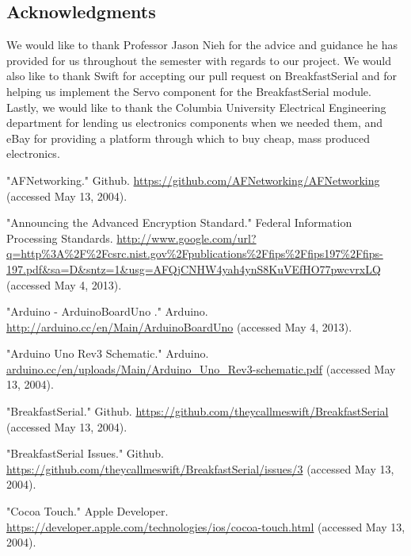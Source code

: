 \documentclass[10pt]{article}
\begin{document}
\begin{multicols}{2}
\section{Acknowledgments}
We would like to thank Professor Jason Nieh for the advice and guidance he has provided for us throughout the semester with regards to our project. We would also like to thank Swift \cite{swift} for accepting our pull request on BreakfastSerial and for helping us implement the Servo component for the BreakfastSerial module. Lastly, we would like to thank the Columbia University Electrical Engineering department for lending us electronics components when we needed them, and eBay for providing a platform through which to buy cheap, mass produced electronics. 






\begin{thebibliography}{99} %
  
  "AFNetworking." Github. \url{https://github.com/AFNetworking/AFNetworking} (accessed May 13, 2004).

"Announcing the Advanced Encryption Standard." Federal Information Processing Standards. \url{http://www.google.com/url?q=http\%3A\%2F\%2Fcsrc.nist.gov\%2Fpublications\%2Ffips\%2Ffips197\%2Ffips-197.pdf&sa=D&sntz=1&usg=AFQjCNHW4yah4ynS8KuVEfHO77pwcvrxLQ} (accessed May 4, 2013).

"Arduino - ArduinoBoardUno ." Arduino. \url{http://arduino.cc/en/Main/ArduinoBoardUno} (accessed May 4, 2013).

"Arduino Uno Rev3 Schematic." Arduino. \url{arduino.cc/en/uploads/Main/Arduino_Uno_Rev3-schematic.pdf} (accessed May 13, 2004).

"BreakfastSerial." Github. \url{https://github.com/theycallmeswift/BreakfastSerial} (accessed May 13, 2004).

"BreakfastSerial Issues." Github. \url{https://github.com/theycallmeswift/BreakfastSerial/issues/3} (accessed May 13, 2004).

"Cocoa Touch." Apple Developer. \url{https://developer.apple.com/technologies/ios/cocoa-touch.html} (accessed May 13, 2004).


\end{thebibliography}
\end{multicols}
\end{document}
